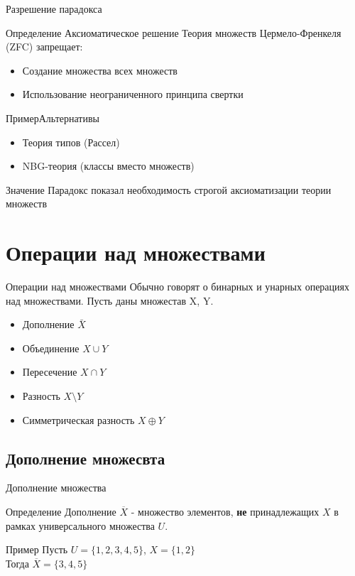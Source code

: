 \documentclass{beamer}
\newenvironment{rusdefinition}[1][Определение]{
    \begin{block}{#1}
}{\end{block}}
\newenvironment{rexample}[1][Пример]{\begin{exampleblock}{#1}}{\end{exampleblock}}
\begin{document}
\begin{frame}{Разрешение парадокса}
\begin{rusdefinition}{Аксиоматическое решение}
Теория множеств Цермело-Френкеля (ZFC) запрещает:
\begin{itemize}
\item Создание множества всех множеств
\item Использование неограниченного принципа свертки
\end{itemize}
\end{rusdefinition}

\begin{rexample}{Альтернативы}
\begin{itemize}
\item Теория типов (Рассел)
\item NBG-теория (классы вместо множеств)
\end{itemize}
\end{rexample}

\begin{block}{Значение}
Парадокс показал необходимость строгой аксиоматизации теории множеств
\end{block}
\end{frame}

\section{Операции над множествами}

\begin{frame}{Операции над множествами}
Обычно говорят о бинарных и унарных операциях над множествами.
Пусть даны множестав X, Y.
\begin{itemize}
    \item Дополнение $\bar{X}$
    \item Объединение $X \cup Y$
    \item Пересечение $X \cap Y$
    \item Разность $X \setminus Y$
    \item Симметрическая разность $X \oplus Y$
\end{itemize}
\end{frame}

\subsection{Дополнение множесвта}
\begin{frame}{Дополнение множества}
    \begin{block}{Определение}
    Дополнение $\overline{X}$ - множество элементов, \textbf{не} принадлежащих $X$ в рамках универсального множества $U$.
    \end{block}
    \begin{exampleblock}{Пример}
    Пусть $U = \{1,2,3,4,5\}$, $X = \{1,2\}$\\
    Тогда $\overline{X} = \{3,4,5\}$
    \end{exampleblock}
\end{frame}
\end{document}
